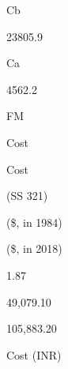 \documentclass[a4paper,portrait,12pt]{article}
\begin{document}
\begin{flushleft}
Cb
\end{flushleft}


23805.9





\begin{flushleft}
Ca
\end{flushleft}


4562.2





\begin{flushleft}
FM
\end{flushleft}





\begin{flushleft}
Cost
\end{flushleft}





\begin{flushleft}
Cost
\end{flushleft}





\begin{flushleft}
(SS 321)
\end{flushleft}





\begin{flushleft}
(\$, in 1984)
\end{flushleft}





\begin{flushleft}
(\$, in 2018)
\end{flushleft}





1.87





49,079.10





105,883.20





\begin{flushleft}
Cost (INR)
\end{flushleft}
\end{document}
